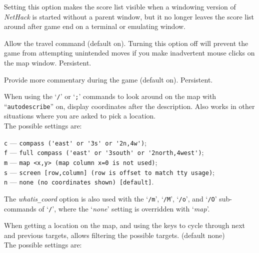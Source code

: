 Setting this option makes the score list visible when a windowing version
of {\it NetHack\/} is started without a parent window, but it no longer leaves
the score list around after game end on a terminal or emulating window.
\item[\ib{travel}]
Allow the travel command (default on).  Turning this option off will
prevent the game from attempting unintended moves if you make inadvertent
mouse clicks on the map window.  Persistent.
\item[\ib{verbose}]
Provide more commentary during the game (default on).  Persistent.
\item[\ib{whatis\verb+_+coord}]
When using the `{\tt /}' or `{\tt ;}' commands to look around on the map with
``{\tt autodescribe}''
on, display coordinates after the description.
Also works in other situations where you are asked to pick a location.\\

The possible settings are:

{\tt c} --- \verb#compass ('east' or '3s' or '2n,4w')#;\\
{\tt f} --- \verb#full compass ('east' or '3south' or '2north,4west')#;\\
{\tt m} --- \verb#map <x,y> (map column x=0 is not used)#;\\
{\tt s} --- \verb#screen [row,column] (row is offset to match tty usage)#;\\
{\tt n} --- \verb#none (no coordinates shown) [default]#.

The
{\it whatis\verb+_+coord\/}
option is also used with
the `{\tt /m}', `{\tt /M}', `{\tt /o}', and `{\tt /O}' sub-commands
of `{\tt /}',
where the `{\it none\/}' setting is overridden with `{\it map}'.
\item[\ib{whatis\verb+_+filter}]
When getting a location on the map, and using the keys to cycle through
next and previous targets, allows filtering the possible targets.
(default none)\\
The possible settings are:

